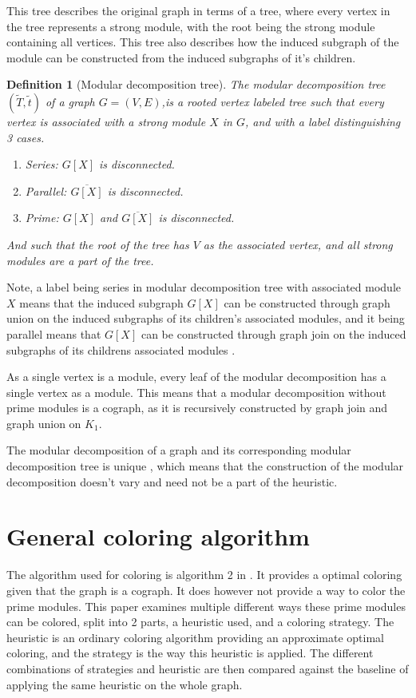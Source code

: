 \documentclass[a4paper]{article}
\newtheorem{definition}{Definition}[section]
\newcommand{\T}{\widetilde{T}}
\renewcommand{\t}{\widetilde{t}}
\begin{document}
This tree describes the original graph in terms of a tree, where every vertex 
in the tree represents a strong module, with the root being the strong module
containing all vertices. This tree also describes how the induced subgraph of the
module can be constructed from the induced subgraphs of it's children.
\begin{definition}[Modular decomposition tree]
    The modular decomposition tree $(\T,\t)$ of a graph $G = (V,E)$,is a rooted
    vertex labeled tree such that every vertex is associated with a strong
    module $X$ in $G$, and with a label distinguishing 3 cases.
    \begin{enumerate}
        \item Series: $G[X]$ is disconnected.
        \item Parallel: $\overline{G[X]}$ is disconnected.
        \item Prime: $G[X]$ and $\overline{G[X]}$ is disconnected.
    \end{enumerate}
    And such that the root of the tree has $V$ as the associated vertex, and all 
    strong modules are a part of the tree.
\end{definition}

Note, a label being series in modular decomposition tree with associated module
$X$ means that the induced subgraph $G[X]$ can be constructed through graph
union on the induced subgraphs of its children's associated modules, and it being
parallel means that $G[X]$ can be constructed through graph join on the
induced subgraphs of its childrens associated modules \cite{HCL}.

As a single vertex is a module, every leaf of the modular decomposition has
a single vertex as a module. This means that a modular decomposition without
prime modules is a cograph, as it is recursively constructed by graph join and
graph union on $K_1$.

The modular decomposition of a graph and its corresponding modular
decomposition tree is unique \cite{MDUnique}, which means that the construction
of the modular decomposition doesn't vary and need not be a part of
the heuristic.


\section{General coloring algorithm}

The algorithm used for coloring is algorithm 2 in \cite{HCL}. It provides a
optimal coloring given that the graph is a cograph. It does however not
provide a way to color the prime modules. This paper examines multiple different
ways these prime modules can be colored, split into 2 parts, a heuristic used,
and a coloring strategy. The heuristic is an ordinary coloring algorithm
providing an approximate optimal coloring, and the strategy is the way this
heuristic is applied. The different combinations of strategies and heuristic are
then compared against the baseline of applying the same heuristic on the whole
graph.
\end{document}
